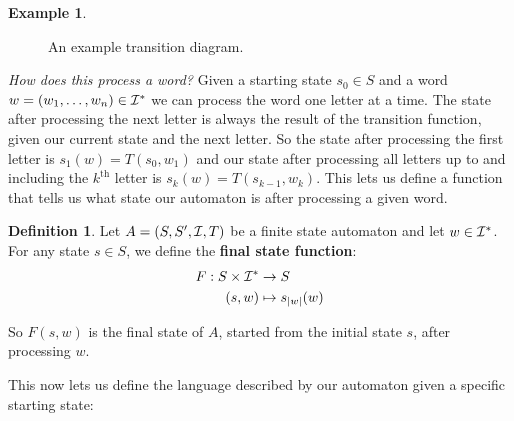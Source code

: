 \documentclass[a4paper]{article}
\theoremstyle{definition}
\newtheorem{definition}{Definition}[section]
\theoremstyle{definition}
\newtheorem{example}{Example}[section]
\theoremstyle{definition}
\begin{document}
\begin{example}
    \begin{figure}[H]
        \centering
        \caption{An example transition diagram.}
        \label{fig:transDiagEx1}
    \end{figure}
\end{example}

\emph{How does this process a word?} Given a starting state \(s_0 \in S\) and a word \(w = (w_1, \dots, w_n) \in \mathcal{I}^*\) we can process the word one letter at a time. The state after processing the next letter is always the result of the transition function, given our current state and the next letter. So the state after processing the first letter is \(s_1(w) = T(s_0, w_1)\) and our state after processing all letters up to and including the \(k^\text{th}\) letter is \(s_k(w) = T(s_{k - 1}, w_k)\). This lets us define a function that tells us what state our automaton is after processing a given word.

\begin{definition}
    \label{def:finalStateFn}
    Let $A = (S, S^\prime, \mathcal{I}, T)$ be a finite state automaton and let $w \in \mathcal{I}^*$. For any state $s \in S$, we define the \textbf{final state function}:
    \begin{align*}
        F : S \times \mathcal{I}^* &\rightarrow S \\
        (s, w) &\mapsto s_{\mid w \mid}(w)
    \end{align*}
    
    So $F(s,w)$ is the final state of $A$, started from the initial state $s$, after processing $w$.
\end{definition}

\noindent This now lets us define the language described by our automaton given a specific starting state:
\end{document}
